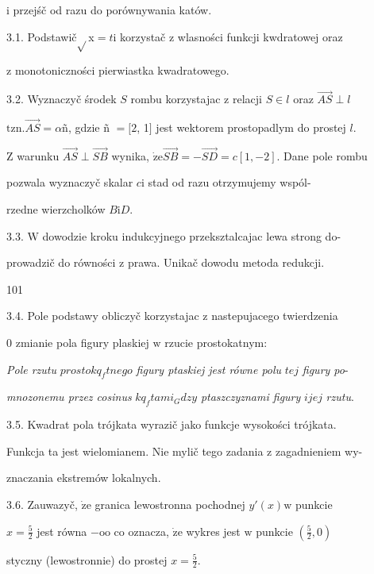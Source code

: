 \documentclass[a4paper,12pt]{article}
\begin{document}
$\mathrm{i}$ przejśč od razu do porównywania katów.

3.1. Podstawič$\sqrt{}$x$=t\mathrm{i}$ korzystač $\mathrm{z}$ wlasności funkcji kwdratowej oraz

$\mathrm{z}$ monotoniczności pierwiastka kwadratowego.

3.2. Wyznaczyč środek $S$ rombu korzystajac $\mathrm{z}$ relacji $S\in l$ oraz $\vec{AS}\perp l$

$\mathrm{t}\mathrm{z}\mathrm{n}. \vec{AS}= \alpha$ñ, gdzie ñ $= [2$, 1$]$ jest wektorem prostopadlym do prostej $l.$

$\mathrm{Z}$ warunku $\vec{AS}\perp\vec{SB}$ wynika, $\dot{\mathrm{z}}\mathrm{e}\vec{SB}= - \vec{SD}=c[1,-2]$. Dane pole rombu

pozwala wyznaczyč skalar $c \mathrm{i}$ stad od razu otrzymujemy wspól-

rzedne wierzcholków $B\mathrm{i}D.$

3.3. $\mathrm{W}$ dowodzie kroku indukcyjnego przeksztalcajac lewa strong do-

prowadzič do równości $\mathrm{z}$ prawa. Unikač dowodu metoda redukcji.





101

3.4. Pole podstawy obliczyč korzystajac $\mathrm{z}$ nastepujacego twierdzenia

$0$ zmianie pola figury plaskiej $\mathrm{w}$ rzucie prostokatnym:

{\it Pole rzutu} $prostokq_{f}tnego$ {\it figury ptaskiej jest równe polu} $tej$ {\it figury po}-

{\it mnozonemu przez cosinus} $kq_{f}tami_{G}dzy$ {\it ptaszczyznami figury} $ijej$ {\it rzutu}.

3.5. Kwadrat pola trójkata wyrazič jako funkcje wysokości trójkata.

Funkcja ta jest wielomianem. Nie mylič tego zadania $\mathrm{z}$ zagadnieniem wy-

znaczania ekstremów lokalnych.

3.6. Zauwazyč, $\dot{\mathrm{z}}\mathrm{e}$ granica lewostronna pochodnej $y'(x) \mathrm{w}$ punkcie

$x = \displaystyle \frac{5}{2}$ jest równa $-\mathrm{o}\mathrm{o}$ co oznacza, $\dot{\mathrm{z}}\mathrm{e}$ wykres jest $\mathrm{w}$ punkcie $(\displaystyle \frac{5}{2},0)$

styczny (lewostronnie) do prostej $x=\displaystyle \frac{5}{2}.$
\end{document}
